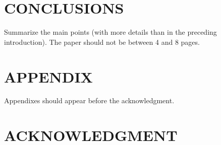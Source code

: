 \documentclass[letterpaper, 10 pt, conference]{ieeeconf}  %
\begin{document}
\section{CONCLUSIONS}

Summarize the main points (with more details than in the preceding introduction).
The paper should not be between 4 and 8 pages.



\addtolength{\textheight}{-12cm}   %



\section*{APPENDIX}

Appendixes should appear before the acknowledgment.

\section*{ACKNOWLEDGMENT}






\end{document}
